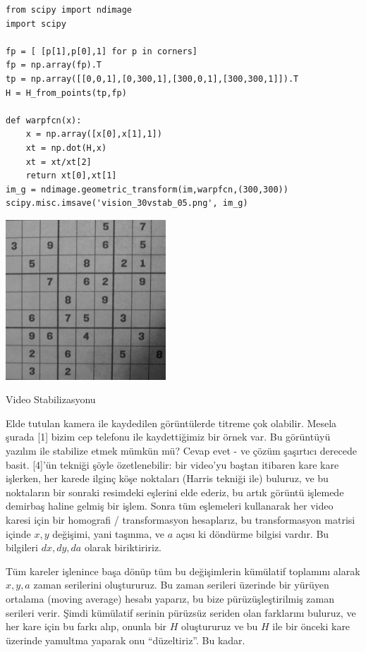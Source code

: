 \documentclass[12pt,fleqn]{article}\usepackage{../../common}
\begin{document}
\begin{verbatim}
from scipy import ndimage
import scipy

fp = [ [p[1],p[0],1] for p in corners]
fp = np.array(fp).T
tp = np.array([[0,0,1],[0,300,1],[300,0,1],[300,300,1]]).T
H = H_from_points(tp,fp)

def warpfcn(x):
    x = np.array([x[0],x[1],1])
    xt = np.dot(H,x)
    xt = xt/xt[2]
    return xt[0],xt[1]
im_g = ndimage.geometric_transform(im,warpfcn,(300,300))
scipy.misc.imsave('vision_30vstab_05.png', im_g)
\end{verbatim}

\includegraphics[height=6cm]{vision_30vstab_05.png}

Video Stabilizasyonu

Elde tutulan kamera ile kaydedilen görüntülerde titreme çok
olabilir. Mesela şurada [1] bizim cep telefonu ile kaydettiğimiz bir örnek
var. Bu görüntüyü yazılım ile stabilize etmek mümkün mü? Cevap evet - ve
çözüm şaşırtıcı derecede basit.  [4]'ün tekniği şöyle özetlenebilir: bir
video'yu baştan itibaren kare kare işlerken, her karede ilginç köşe
noktaları (Harris tekniği ile) buluruz, ve bu noktaların bir sonraki
resimdeki eşlerini elde ederiz, bu artık görüntü işlemede demirbaş haline
gelmiş bir işlem. Sonra tüm eşlemeleri kullanarak her video karesi için bir
homografi / transformasyon hesaplarız, bu transformasyon matrisi içinde
$x,y$ değişimi, yani taşınma, ve $a$ açısı ki döndürme bilgisi vardır. Bu
bilgileri $dx,dy,da$ olarak biriktiririz.

Tüm kareler işlenince başa dönüp tüm bu değişimlerin kümülatif toplamını
alarak $x,y,a$ zaman serilerini oluştururuz. Bu zaman serileri üzerinde bir
yürüyen ortalama (moving average) hesabı yaparız, bu bize
pürüzüşleştirilmiş zaman serileri verir. Şimdi kümülatif serinin pürüzsüz
seriden olan farklarını buluruz, ve her kare için bu farkı alıp, onunla bir
$H$ oluştururuz ve bu $H$ ile bir önceki kare üzerinde yamultma yaparak onu
``düzeltiriz''. Bu kadar.
\end{document}
